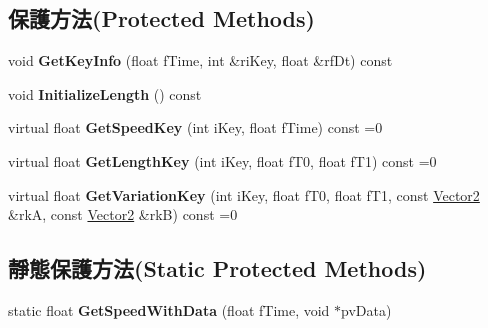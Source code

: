 \subsection*{保護方法(Protected Methods)}
\begin{DoxyCompactItemize}
\item 
void {\bfseries Get\+Key\+Info} (float f\+Time, int \&ri\+Key, float \&rf\+Dt) const \hypertarget{class_magnum_1_1_multiple_curve2_a1d0d9a49e596209402184b35e65fc373}{}\label{class_magnum_1_1_multiple_curve2_a1d0d9a49e596209402184b35e65fc373}

\item 
void {\bfseries Initialize\+Length} () const \hypertarget{class_magnum_1_1_multiple_curve2_a4abad6724a0cf85bd136ec51437dd861}{}\label{class_magnum_1_1_multiple_curve2_a4abad6724a0cf85bd136ec51437dd861}

\item 
virtual float {\bfseries Get\+Speed\+Key} (int i\+Key, float f\+Time) const  =0\hypertarget{class_magnum_1_1_multiple_curve2_a83f732e64a3c799d9650704b9cbd2fa5}{}\label{class_magnum_1_1_multiple_curve2_a83f732e64a3c799d9650704b9cbd2fa5}

\item 
virtual float {\bfseries Get\+Length\+Key} (int i\+Key, float f\+T0, float f\+T1) const  =0\hypertarget{class_magnum_1_1_multiple_curve2_abbd233f80b379636d36c9b559d6bb56f}{}\label{class_magnum_1_1_multiple_curve2_abbd233f80b379636d36c9b559d6bb56f}

\item 
virtual float {\bfseries Get\+Variation\+Key} (int i\+Key, float f\+T0, float f\+T1, const \hyperlink{class_magnum_1_1_vector2}{Vector2} \&rkA, const \hyperlink{class_magnum_1_1_vector2}{Vector2} \&rkB) const  =0\hypertarget{class_magnum_1_1_multiple_curve2_a626126c24cbf64f93eb942b6cb1c7ffc}{}\label{class_magnum_1_1_multiple_curve2_a626126c24cbf64f93eb942b6cb1c7ffc}

\end{DoxyCompactItemize}
\subsection*{靜態保護方法(Static Protected Methods)}
\begin{DoxyCompactItemize}
\item 
static float {\bfseries Get\+Speed\+With\+Data} (float f\+Time, void $\ast$pv\+Data)\hypertarget{class_magnum_1_1_multiple_curve2_ab9ab7dec7c2a78754e0e5484276c2a67}{}\label{class_magnum_1_1_multiple_curve2_ab9ab7dec7c2a78754e0e5484276c2a67}

\end{DoxyCompactItemize}
